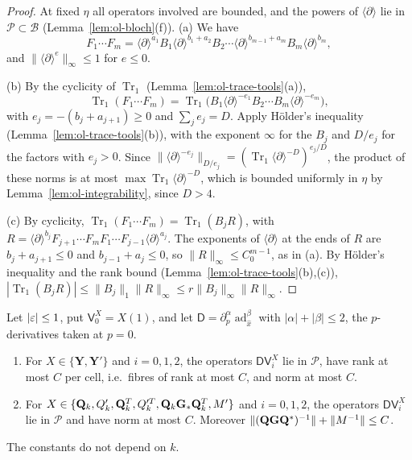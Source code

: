 \begin{proof}
At fixed $\eta$ all operators involved are bounded, and the powers of $\langle\partial\rangle$ lie in $\mathscr P\subset\mathscr B$ (Lemma~\ref{lem:ol-bloch}(f)). (a) We have
\[
F_1\cdots F_m=\langle\partial\rangle^{a_1}B_1\langle\partial\rangle^{b_1+a_2}B_2\cdots\langle\partial\rangle^{b_{m-1}+a_m}B_m\langle\partial\rangle^{b_m},
\]
and $\|\langle\partial\rangle^{e}\|_\infty\le1$ for $e\le0$.

(b) By the cyclicity of $\operatorname{Tr}_1$ (Lemma~\ref{lem:ol-trace-tools}(a)),
\[
\operatorname{Tr}_1(F_1\cdots F_m)=\operatorname{Tr}_1\big(B_1\langle\partial\rangle^{-e_1}B_2\cdots B_m\langle\partial\rangle^{-e_m}\big),
\]
with $e_j=-(b_j+a_{j+1})\ge0$ and $\sum_je_j=D$. Apply H\"older's inequality (Lemma~\ref{lem:ol-trace-tools}(b)), with the exponent $\infty$ for the $B_j$ and $D/e_j$ for the factors with $e_j>0$. Since $\|\langle\partial\rangle^{-e_j}\|_{D/e_j}=(\operatorname{Tr}_1\langle\partial\rangle^{-D})^{e_j/D}$, the product of these norms is at most $\max\operatorname{Tr}_1\langle\partial\rangle^{-D}$, which is bounded uniformly in $\eta$ by Lemma~\ref{lem:ol-integrability}, since $D>4$.

(c) By cyclicity, $\operatorname{Tr}_1(F_1\cdots F_m)=\operatorname{Tr}_1(B_jR)$, with $R=\langle\partial\rangle^{b_j}F_{j+1}\cdots F_mF_1\cdots F_{j-1}\langle\partial\rangle^{a_j}$. The exponents of $\langle\partial\rangle$ at the ends of $R$ are $b_j+a_{j+1}\le0$ and $b_{j-1}+a_j\le0$, so $\|R\|_\infty\le C_0^{m-1}$, as in (a). By H\"older's inequality and the rank bound (Lemma~\ref{lem:ol-trace-tools}(b),(c)), $|\operatorname{Tr}_1(B_jR)|\le\|B_j\|_1\|R\|_\infty\le r\|B_j\|_\infty\|R\|_\infty$.
\end{proof}

\begin{lemma}\label{lem:ol-remainders}
Let $|\varepsilon|\le1$, put $\mathsf V_0^X=X(1)$, and let $\mathsf D=\partial_p^\alpha\operatorname{ad}_{\hat x}^\beta$ with $|\alpha|+|\beta|\le2$, the $p$-derivatives taken at $p=0$.
\begin{enumerate}[label=(\alph*)]
\item For $X\in\{\mathbf Y,\mathbf Y'\}$ and $i=0,1,2$, the operators $\mathsf D\mathsf V_i^X$ lie in $\mathscr P$, have rank at most $C$ per cell, i.e.\ fibres of rank at most $C$, and norm at most $C$.
\item For $X\in\{\mathbf Q_k,Q'_k,\mathbf Q_k^T,Q'^T_k,\mathbf Q_k\mathbf G_*\mathbf Q_k^T,M'\}$ and $i=0,1,2$, the operators $\mathsf D\mathsf V_i^X$ lie in $\mathscr P$ and have norm at most $C$. Moreover $\|(\mathbf Q\mathbf G\mathbf Q^*)^{-1}\|+\|M^{-1}\|\le C$.
\end{enumerate}
The constants do not depend on $k$.
\end{lemma}

